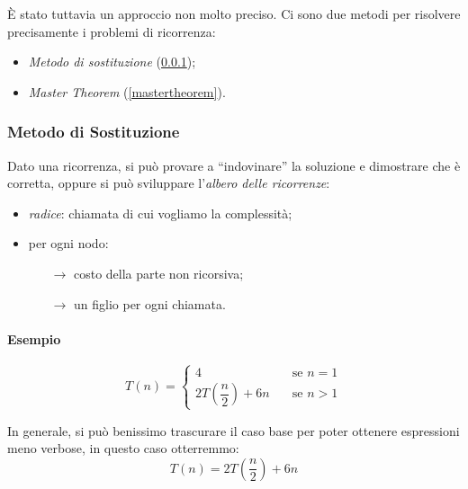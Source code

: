 È stato tuttavia un approccio non molto preciso. Ci sono due metodi per risolvere precisamente 
i problemi di ricorrenza:
\begin{itemize}[noitemsep]
	\item \emph{Metodo di sostituzione} (\ref{ricorrenze:sostituzione});
	\item \emph{Master Theorem} (\ref{mastertheorem}).
\end{itemize}

\subsubsection{Metodo di Sostituzione} \label{ricorrenze:sostituzione}
Dato una ricorrenza, si può provare a ``indovinare'' la soluzione e dimostrare che è corretta, oppure si può sviluppare l'\emph{albero %
delle ricorrenze}:
\begin{itemize}
	\item \emph{radice}: chiamata di cui vogliamo la complessità;
	\item per ogni nodo:
	\begin{itemize}
		\item[$\rightarrow$] costo della parte non ricorsiva;
		\item[$\rightarrow$] un figlio per ogni chiamata.
	\end{itemize}
\end{itemize}

\paragraph{Esempio} 

\[ T(n) =
\begin{cases}
4       & \quad \text{se } n = 1 \\
2T(\dfrac{n}{2})+ 6n  & \quad \text{se } n>1
\end{cases}
\]

In generale, si può benissimo trascurare il caso base per poter ottenere espressioni meno verbose, in questo 
caso otterremmo:
\begin{displaymath}
	T(n) = 2T(\frac{n}{2})+ 6n
\end{displaymath}

